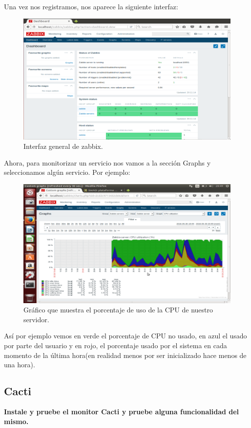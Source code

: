 \begin{itemize}
	Una vez nos registramos, nos aparece la siguiente interfaz:\\
	\begin{figure}[H]
	\centering
	\includegraphics[width=0.7\linewidth]{zabbixPORFIN}
	\caption[Interfaz zabbix]{Interfaz general de zabbix.}
	\label{fig:zabbixPORFIN}
	\end{figure}
	
	Ahora, para monitorizar un  servicio nos vamos a la sección Graphs y seleccionamos algún servicio. Por ejemplo:\\
	\begin{figure}[H]
	\centering
	\includegraphics[width=0.7\linewidth]{CPUUsage}
	\caption[Uso de CPU]{Gráfico que muestra el porcentaje de uso de la CPU de nuestro servidor.}
	\label{fig:CPUUsage}
	\end{figure}
	Así por ejemplo vemos en verde el porcentaje de CPU no usado, en azul el usado por parte del usuario y en rojo, el porcentaje usado por el sistema en cada momento de la última hora(en realidad menos por ser inicializado hace menos de una hora).


	
	
\end{itemize}
\subsection{Cacti}

\textbf{Instale y pruebe el monitor Cacti y pruebe alguna funcionalidad del mismo.}\\


